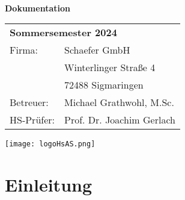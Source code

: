 \documentclass[
	ngerman,
	a4paper,
	twoside
]{scrbook}
\begin{document}
\begin{titlepage}
	\begin{center}
	\vspace*{1cm}
		{\Huge\bfseries\doctitle\\[1em]\large Dokumentation}
	\vspace{1cm}
		\date{\today} %
		
		\docauthor
	\end{center}

	\vspace*{90mm}

	\begin{tabular}{ ll }
		\multicolumn{2}{l}{\textbf{Sommersemester 2024}} \\
		Firma: &  Schaefer GmbH\\
	   	& Winterlinger Straße 4\\
		& 72488 Sigmaringen\\
		Betreuer: & Michael Grathwohl, M.Sc.\\
		HS-Prüfer: & Prof. Dr. Joachim Gerlach
	\end{tabular}
	\vspace{0.5cm}
	\begin{flushright}
    	\texttt{[image: logoHsAS.png]}
	\end{flushright}	
\end{titlepage}




	\tableofcontents
	\listoffigures
	\listoftables
	\ifdeutsch
	\else
	\fi
	\printnoidxglossary[type=\acronymtype]


\chapter{Einleitung}
	
	
\end{document}
